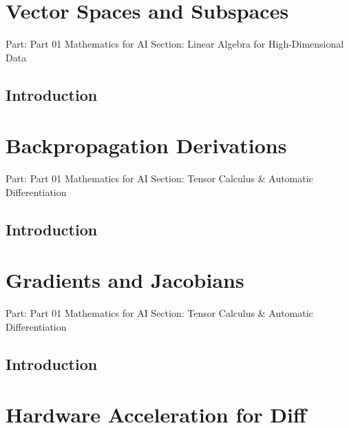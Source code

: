 \documentclass[11pt,a4paper,twoside]{book}
\begin{document}
\newpage

\hypertarget{vector-spaces-and-subspaces}{%
\section{Vector Spaces and
Subspaces}\label{vector-spaces-and-subspaces}}

Part: Part 01 Mathematics for AI Section: Linear Algebra for
High-Dimensional Data

\hypertarget{introduction}{%
\subsection{Introduction}\label{introduction}}


\newpage

\hypertarget{backpropagation-derivations}{%
\section{Backpropagation
Derivations}\label{backpropagation-derivations}}

Part: Part 01 Mathematics for AI Section: Tensor Calculus \& Automatic
Differentiation

\hypertarget{introduction}{%
\subsection{Introduction}\label{introduction}}


\newpage

\hypertarget{gradients-and-jacobians}{%
\section{Gradients and Jacobians}\label{gradients-and-jacobians}}

Part: Part 01 Mathematics for AI Section: Tensor Calculus \& Automatic
Differentiation

\hypertarget{introduction}{%
\subsection{Introduction}\label{introduction}}


\newpage

\hypertarget{hardware-acceleration-for-diff}{%
\section{Hardware Acceleration for
Diff}\label{hardware-acceleration-for-diff}}
\end{document}
